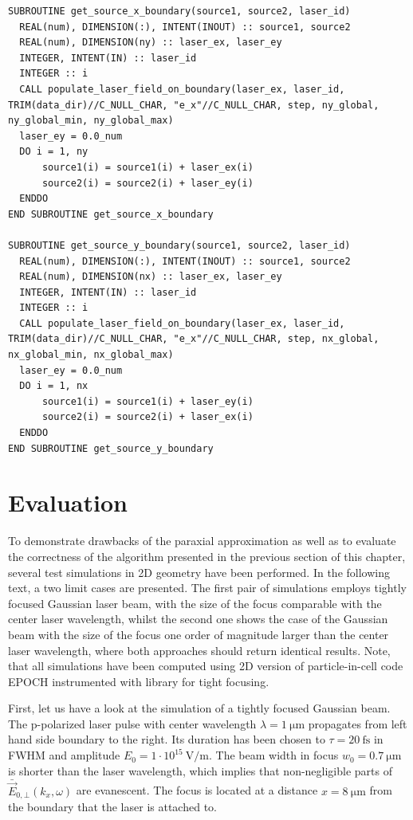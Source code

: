 \begin{lstlisting}[style=FORTRAN, caption=Fortran subroutines for populating laser sources on boundaries]
SUBROUTINE get_source_x_boundary(source1, source2, laser_id) 
  REAL(num), DIMENSION(:), INTENT(INOUT) :: source1, source2
  REAL(num), DIMENSION(ny) :: laser_ex, laser_ey
  INTEGER, INTENT(IN) :: laser_id
  INTEGER :: i
  CALL populate_laser_field_on_boundary(laser_ex, laser_id, TRIM(data_dir)//C_NULL_CHAR, "e_x"//C_NULL_CHAR, step, ny_global, ny_global_min, ny_global_max)
  laser_ey = 0.0_num
  DO i = 1, ny
	  source1(i) = source1(i) + laser_ex(i)
	  source2(i) = source2(i) + laser_ey(i)
  ENDDO
END SUBROUTINE get_source_x_boundary
  
SUBROUTINE get_source_y_boundary(source1, source2, laser_id)
  REAL(num), DIMENSION(:), INTENT(INOUT) :: source1, source2
  REAL(num), DIMENSION(nx) :: laser_ex, laser_ey
  INTEGER, INTENT(IN) :: laser_id
  INTEGER :: i
  CALL populate_laser_field_on_boundary(laser_ex, laser_id, TRIM(data_dir)//C_NULL_CHAR, "e_x"//C_NULL_CHAR, step, nx_global, nx_global_min, nx_global_max)
  laser_ey = 0.0_num
  DO i = 1, nx
	  source1(i) = source1(i) + laser_ey(i)
	  source2(i) = source2(i) + laser_ex(i)
  ENDDO
END SUBROUTINE get_source_y_boundary
\end{lstlisting}


\section{Evaluation}

To demonstrate drawbacks of the paraxial approximation as well as to evaluate the correctness of the algorithm presented in the previous section of this chapter, several test simulations in 2D geometry have been performed. In the following text, a two limit cases are presented. The first pair of simulations employs tightly focused Gaussian laser beam, with the size of the focus comparable with the center laser wavelength, whilst the second one shows the case of the Gaussian beam with the size of the focus one order of magnitude larger than the center laser wavelength, where both approaches should return identical results. Note, that all simulations have been computed using 2D version of particle-in-cell code EPOCH instrumented with library for tight focusing.

First, let us have a look at the simulation of a tightly focused Gaussian beam. The p-polarized laser pulse with center wavelength $ \lambda = 1 \: \mathrm{\mu m} $ propagates from left hand side boundary to the right. Its duration has been chosen to $ \tau = 20 \: \mathrm{fs} $ in FWHM and amplitude $ E_0 = 1 \cdot 10^{15} \: \mathrm{V/m} $. The beam width in focus $ w_0 = 0.7 \: \mathrm{\mu m} $ is shorter than the laser wavelength, which implies that non-negligible parts of $ \bar{\vec{E}}_{0, \bot}(k_x, \omega) $ are evanescent. The focus is located at a distance $ x = 8 \: \mathrm{\mu m} $ from the boundary that the laser is attached to.

